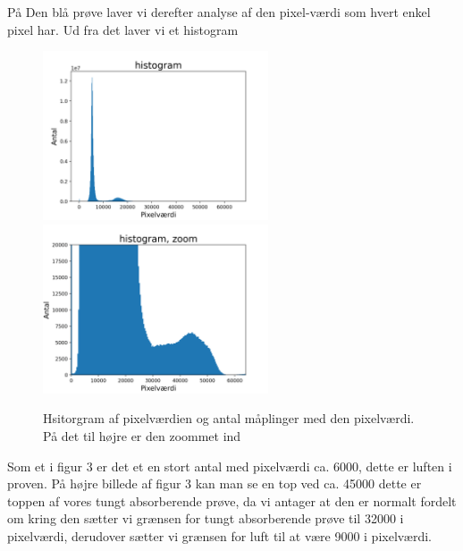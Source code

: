 \documentclass[a4paper,twoside]{article}
\begin{document}
På Den blå prøve laver vi derefter analyse af den pixel-værdi som hvert enkel pixel har. Ud fra det laver vi et histogram
\begin{figure}[H]
\begin{centering}
\includegraphics[height=5cm]{index ikke_xoom.png}
\includegraphics[height=5cm]{index_zoom.png}
\hspace{1cm}
\par\end{centering}
\caption{\label{cap:2ien} Hsitorgram  af pixelværdien og antal måplinger med den pixelværdi. På det til højre er den zoommet ind}
\end{figure}
Som et i figur 3 er det et en stort antal med pixelværdi ca. 6000, dette er luften i proven. På højre billede af figur 3 kan man se en top ved ca. 45000 dette er toppen af vores tungt absorberende prøve, da vi antager at den er normalt fordelt om kring den sætter vi grænsen for tungt absorberende prøve til 32000 i pixelværdi, derudover sætter vi grænsen for luft til at være 9000 i pixelværdi. 
\end{document}
